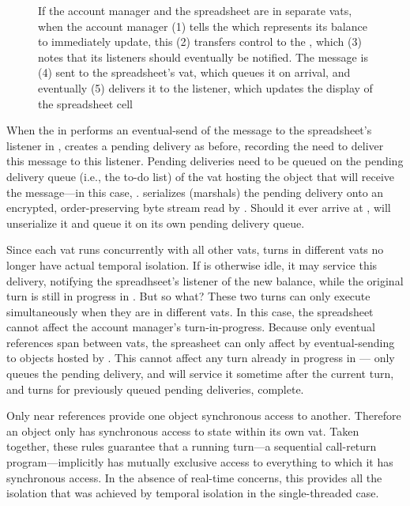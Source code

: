 \documentclass{llncs}
\begin{document}
\begin{figure}
\centerline{}
\caption{If the account manager and the spreadsheet are in separate
  vats, when the account manager (1) tells the 
  which represents its balance to immediately update, this (2)
  transfers control to the , which (3) notes that
  its listeners should eventually be notified. The message is (4) sent
  to the spreadsheet's vat, which queues it on arrival, and eventually
  (5) delivers it to the listener, which updates the display of the
  spreadsheet cell}
\label{fig:2vat}
\end{figure}

When the  in  performs an eventual-send of
the  message to the spreadsheet's listener in
,  creates a pending delivery as before, recording the
need to deliver this message to this listener. Pending deliveries need
to be queued on the pending delivery queue (i.e., the to-do list)
of the vat hosting the object that will receive the message---in this
case, .  serializes (marshals) the pending delivery onto
an encrypted, order-preserving byte stream read by . Should it
ever arrive at ,  will unserialize it and queue it on
its own pending delivery queue.

Since each vat runs concurrently with all other vats, turns in
different vats no longer have actual temporal isolation. If  is
otherwise idle, it may service this delivery, notifying the
spreadhseet's listener of the new balance, while the original turn is
still in progress in . But so what? These two turns can only
execute simultaneously when they are in different vats. In this case,
the spreadsheet cannot affect the account manager's
turn-in-progress. Because only eventual references span between vats,
the spreasheet can only affect  by eventual-sending to objects
hosted by . This cannot affect any turn already in progress in
--- only queues the pending delivery, and will service
it sometime after the current turn, and turns for previously queued
pending deliveries, complete.

Only near references provide one object synchronous access to
another. Therefore an object only has synchronous access to state
within its own vat. Taken together, these rules guarantee that a
running turn---a sequential call-return program---implicitly has
mutually exclusive access to everything to which it has synchronous
access. In the absence of real-time concerns, this provides all the
isolation that was achieved by temporal isolation in the
single-threaded case.
\end{document}
